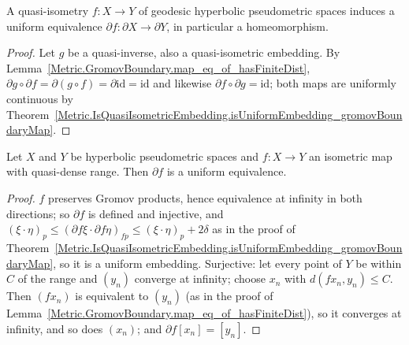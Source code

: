 \begin{corollary}
  \label{Metric.IsQuasiIsometry.gromovBoundaryEquiv}
  A quasi-isometry $f \colon X \to Y$ of geodesic hyperbolic pseudometric spaces induces a uniform
  equivalence $\partial f \colon \partial X \to \partial Y$, in particular a homeomorphism.
\end{corollary}
\begin{proof}
  Let $g$ be a quasi-inverse, also a quasi-isometric embedding. By
  Lemma~\ref{Metric.GromovBoundary.map_eq_of_hasFiniteDist}, $\partial g \circ \partial f =
  \partial(g \circ f) = \partial \mathrm{id} = \mathrm{id}$ and likewise $\partial f \circ \partial
  g = \mathrm{id}$; both maps are uniformly continuous by
  Theorem~\ref{Metric.IsQuasiIsometricEmbedding.isUniformEmbedding_gromovBoundaryMap}.
\end{proof}

\begin{corollary}
  \label{Isometry.gromovBoundaryEquiv}
  Let $X$ and $Y$ be hyperbolic pseudometric spaces and $f \colon X \to Y$ an isometric map with
  quasi-dense range. Then $\partial f$ is a uniform equivalence.
\end{corollary}
\begin{proof}
  $f$ preserves Gromov products, hence equivalence at infinity in both directions; so $\partial f$
  is defined and injective, and $(\xi \cdot \eta)_p \le (\partial f \xi \cdot \partial f \eta)_{f p}
  \le (\xi \cdot \eta)_p + 2\delta$ as in the proof of
  Theorem~\ref{Metric.IsQuasiIsometricEmbedding.isUniformEmbedding_gromovBoundaryMap}, so it is a
  uniform embedding. Surjective: let every point of $Y$ be within $C$ of the range and $(y_n)$
  converge at infinity; choose $x_n$ with $d(f x_n, y_n) \le C$. Then $(f x_n)$ is equivalent to
  $(y_n)$ (as in the proof of Lemma~\ref{Metric.GromovBoundary.map_eq_of_hasFiniteDist}), so it
  converges at infinity, and so does $(x_n)$; and $\partial f [x_n] = [y_n]$.
\end{proof}


